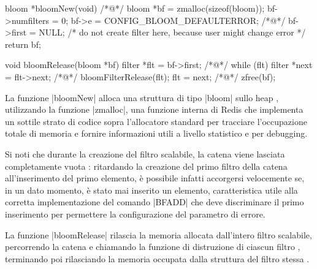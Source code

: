 \begin{commentedsource}[style=csource,caption=Creazione e distruzione di un filtro scalabile]
bloom *bloomNew(void) {
/*@\lnote@*/	bloom *bf = zmalloc(sizeof(bloom));
	bf->numfilters = 0; 
    bf->e = CONFIG_BLOOM_DEFAULTERROR;
/*@\lnote@*/    bf->first = NULL; /* do not create filter here, because user might change error */ 
	return bf;
}

void bloomRelease(bloom *bf) {
    filter *flt = bf->first;
/*@\lnote@*/    while (flt) { 
        filter *next = flt->next;
/*@\lnote@*/        bloomFilterRelease(flt); 
        flt = next;
    }
/*@\lnote@*/    zfree(bf); 
}
\end{commentedsource}

La funzione \cverb|bloomNew| alloca una struttura di tipo \cverb|bloom| sullo heap ,
utilizzando la funzione \cverb|zmalloc|, una funzione interna di Redis che implementa un sottile
strato di codice sopra l'allocatore standard per tracciare l'occupazione totale di memoria e fornire
informazioni utili a livello statistico e per debugging.

Si noti che durante la creazione del filtro scalabile, la catena viene lasciata completamente vuota
: ritardando la creazione del primo filtro della catena all'inserimento del primo elemento,
è possibile infatti accorgersi velocemente se, in un dato momento, è stato mai inserito un elemento,
caratteristica utile alla corretta implementazione del comando \cverb|BFADD| che deve discriminare il
primo inserimento per permettere la configurazione del parametro di errore.

La funzione \cverb|bloomRelease| rilascia la memoria allocata dall'intero filtro scalabile,
percorrendo la catena  e chiamando la funzione di distruzione di ciascun filtro ,
terminando poi rilasciando la memoria occupata dalla struttura del filtro stessa .

